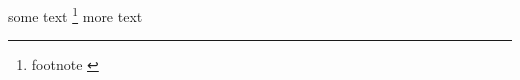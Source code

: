 \documentclass{article}
\begin{document}

some text%
\footnote{footnote \label{fn1}} 
more text%
\end{document}
